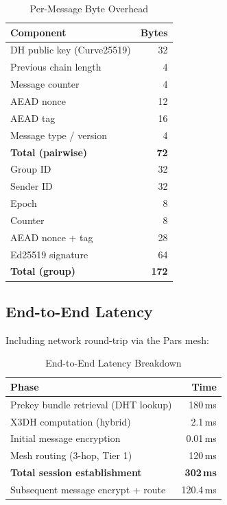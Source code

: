 \documentclass[11pt,a4paper]{article}
\begin{document}
\begin{table}[h]
\centering
\caption{Per-Message Byte Overhead}
\label{tab:overhead}
\begin{tabular}{@{}lr@{}}
\toprule
\textbf{Component} & \textbf{Bytes} \\
\midrule
DH public key (Curve25519)    & 32 \\
Previous chain length         & 4 \\
Message counter               & 4 \\
AEAD nonce                    & 12 \\
AEAD tag                      & 16 \\
Message type / version        & 4 \\
\midrule
\textbf{Total (pairwise)}     & \textbf{72} \\
\midrule
Group ID                      & 32 \\
Sender ID                     & 32 \\
Epoch                         & 8 \\
Counter                       & 8 \\
AEAD nonce + tag              & 28 \\
Ed25519 signature             & 64 \\
\midrule
\textbf{Total (group)}        & \textbf{172} \\
\bottomrule
\end{tabular}
\end{table}

\subsection{End-to-End Latency}

Including network round-trip via the Pars mesh:

\begin{table}[h]
\centering
\caption{End-to-End Latency Breakdown}
\label{tab:latency}
\begin{tabular}{@{}lr@{}}
\toprule
\textbf{Phase} & \textbf{Time} \\
\midrule
Prekey bundle retrieval (DHT lookup)  & 180\,ms \\
X3DH computation (hybrid)            & 2.1\,ms \\
Initial message encryption            & 0.01\,ms \\
Mesh routing (3-hop, Tier 1)          & 120\,ms \\
\midrule
\textbf{Total session establishment}  & \textbf{302\,ms} \\
\midrule
Subsequent message encrypt + route    & 120.4\,ms \\
\bottomrule
\end{tabular}
\end{table}
\end{document}
